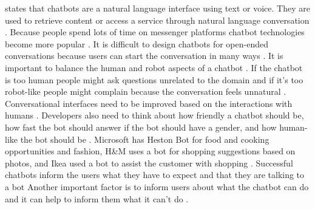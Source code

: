 \citet{brandtzaeg2018chatbots} states that chatbots are a natural language interface using text or voice.
They are used to retrieve content or access a service through natural language conversation \cite{brandtzaeg2018chatbots}.
Because people spend lots of time on messenger platforms chatbot technologies become more popular \cite{brandtzaeg2018chatbots}.
It is difficult to design chatbots for open-ended conversations because users can start the conversation in many ways \cite{brandtzaeg2018chatbots}.
It is important to balance the human and robot aspects of a chatbot \cite{brandtzaeg2018chatbots}.
If the chatbot is too human people might ask questions unrelated to the domain and if it's too robot-like people might complain because the conversation feels unnatural \cite{brandtzaeg2018chatbots}.
Conversational interfaces need to be improved based on the interactions with humans \cite{brandtzaeg2018chatbots}.
Developers also need to think about how friendly a chatbot should be, how fast the bot should answer if the bot should have a gender, and how human-like the bot should be \cite{brandtzaeg2018chatbots}.
Microsoft has Heston Bot for food and cooking opportunities and fashion, H\&M uses a bot for shopping suggestions based on photos, and Ikea used a bot to assist the customer with shopping \cite{brandtzaeg2018chatbots}.
Successful chatbots inform the users what they have to expect and that they are talking to a bot \cite{brandtzaeg2018chatbots}
Another important factor is to inform users about what the chatbot can do and it can help to inform them what it can't do \cite{brandtzaeg2018chatbots}.

